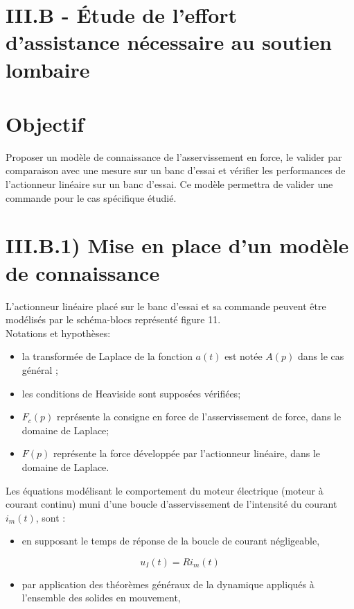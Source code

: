 \documentclass[10pt]{article}
\begin{document}
\section{III.B - Étude de l'effort d'assistance nécessaire au soutien lombaire}
\section{Objectif}
Proposer un modèle de connaissance de l'asservissement en force, le valider par comparaison avec une mesure sur un banc d'essai et vérifier les performances de l'actionneur linéaire sur un banc d'essai. Ce modèle permettra de valider une commande pour le cas spécifique étudié.

\section{III.B.1) Mise en place d'un modèle de connaissance}
L'actionneur linéaire placé sur le banc d'essai et sa commande peuvent être modélisés par le schéma-blocs représenté figure 11.\\
Notations et hypothèses:

\begin{itemize}
  \item la transformée de Laplace de la fonction $a(t)$ est notée $A(p)$ dans le cas général ;
  \item les conditions de Heaviside sont supposées vérifiées;
  \item $F_{c}(p)$ représente la consigne en force de l'asservissement de force, dans le domaine de Laplace;
  \item $F(p)$ représente la force développée par l'actionneur linéaire, dans le domaine de Laplace.
\end{itemize}

Les équations modélisant le comportement du moteur électrique (moteur à courant continu) muni d'une boucle d'asservissement de l'intensité du courant $i_{m}(t)$, sont :

\begin{itemize}
  \item en supposant le temps de réponse de la boucle de courant négligeable,
\end{itemize}

$$
u_{I}(t)=R i_{m}(t)
$$

\begin{itemize}
  \item par application des théorèmes généraux de la dynamique appliqués à l'ensemble des solides en mouvement,
\end{itemize}
\end{document}
